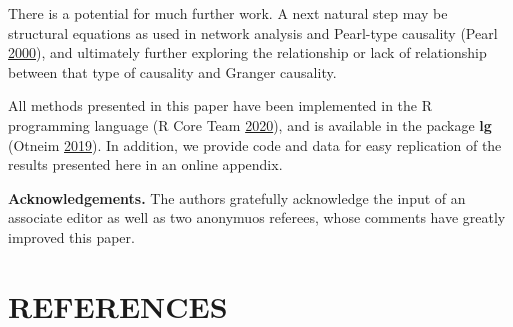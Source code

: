 \documentclass[
  12pt,
  letterpaper]{article}
\theoremstyle{definition}
\theoremstyle{definition}
\theoremstyle{definition}
\theoremstyle{remark}
\begin{document}
There is a potential for much further work. A next natural step may be structural equations as used in network analysis and Pearl-type causality (Pearl \protect\hyperlink{ref-pearl2000causality}{2000}), and ultimately further exploring the relationship or lack of relationship between that type of causality and Granger causality.

All methods presented in this paper have been implemented in the R programming language (R Core Team \protect\hyperlink{ref-r}{2020}), and is available in the package \textbf{lg} (Otneim \protect\hyperlink{ref-otneim2019lg}{2019}). In addition, we provide code and data for easy replication of the results presented here in an online appendix.

\textbf{Acknowledgements.} The authors gratefully acknowledge the input of an associate editor as well as two anonymuos referees, whose comments have greatly improved this paper.

\hypertarget{references}{%
\section*{REFERENCES}\label{references}}
\end{document}
